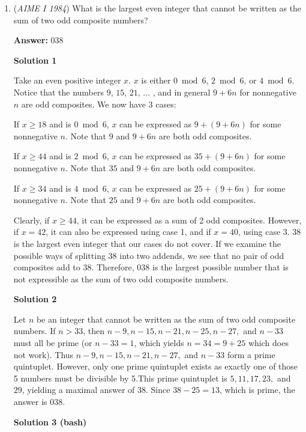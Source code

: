 \begin{enumerate}
	\item (\textit{AIME I 1984}) What is the largest even integer that cannot be written as the sum of two odd composite numbers?


 
 \textbf{Answer: }038



\textbf{Solution 1}

Take an even positive integer $x$. $x$ is either $0 \bmod{6}$, $2 \bmod{6}$, or $4 \bmod{6}$. Notice that the numbers $9$, $15$, $21$, ... , and in general $9 + 6n$ for nonnegative $n$ are odd composites. We now have 3 cases:

 If $x \ge 18$ and is $0 \bmod{6}$, $x$ can be expressed as $9 + (9+6n)$ for some nonnegative $n$. Note that $9$ and $9+6n$ are both odd composites. 

 If $x\ge 44$ and is $2 \bmod{6}$, $x$ can be expressed as $35 + (9+6n)$ for some nonnegative $n$. Note that $35$ and $9+6n$ are both odd composites. 

 If $x\ge 34$ and is $4 \bmod{6}$, $x$ can be expressed as $25 + (9+6n)$ for some nonnegative $n$. Note that $25$ and $9+6n$ are both odd composites.

 
Clearly, if $x \ge 44$, it can be expressed as a sum of 2 odd composites. However, if $x = 42$, it can also be expressed using case 1, and if $x = 40$, using case 3. $38$ is the largest even integer that our cases do not cover. If we examine the possible ways of splitting $38$ into two addends, we see that no pair of odd composites add to $38$. Therefore, $\boxed{038}$ is the largest possible number that is not expressible as the sum of two odd composite numbers.

 



\textbf{Solution 2}

Let $n$ be an integer that cannot be written as the sum of two odd composite numbers. If $n>33$, then $n-9,n-15,n-21,n-25,n-27,$ and $n-33$ must all be prime (or $n-33=1$, which yields $n=34=9+25$ which does not work). Thus $n-9,n-15,n-21,n-27,$ and $n-33$ form a prime quintuplet. However, only one prime quintuplet exists as exactly one of those 5 numbers must be divisible by 5.This prime quintuplet is $5,11,17,23,$ and $29$, yielding a maximal answer of 38. Since $38-25=13$, which is prime, the answer is $\boxed{038}$.

 



\textbf{Solution 3 (bash)}


\end{enumerate}
